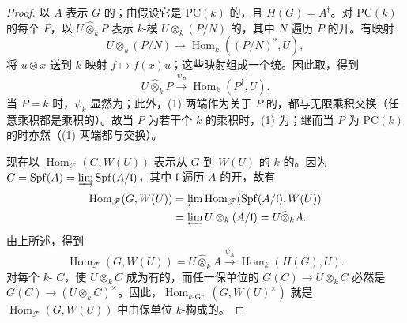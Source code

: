 \begin{proof}
以 $A$ 表示 $G$ 的；由假设它是 $\mathrm{PC}(k)$ 的，且 $H(G)=A^\dagger$。对 $\mathrm{PC}(k)$ 的每个 $P$，以 $U\widehat\otimes_k P$ 表示 $k$-模 $U\otimes_k(P/N)$ 的，其中 $N$ 遍历 $P$ 的开。有映射
\[
U\otimes_k(P/N)\longrightarrow\operatorname{Hom}_k((P/N)^*,U),
\]
将 $u\otimes x$ 送到 $k$-映射 $f\mapsto f(x)u$；这些映射组成一个统。因此取，得到
\[
U\widehat\otimes_k P\xrightarrow{\psi_P}\operatorname{Hom}_k(P^\dagger,U).\tag{1}
\]
当 $P=k$ 时，$\psi_k$ 显然为；此外，(1) 两端作为关于 $P$ 的，都与无限乘积交换（任意乘积都是乘积的）。故当 $P$ 为若干个 $k$ 的乘积时，(1) 为；继而当 $P$ 为 $\mathrm{PC}(k)$ 的时亦然（(1) 两端都与交换）。

现在以 $\operatorname{Hom}_{\mathscr F}(G,W(U))$ 表示从 $G$ 到 $W(U)$ 的 $k$-的。因为 $G=\operatorname{Spf}(A)=\varinjlim\operatorname{Spf}(A/\mathfrak l)$，其中 $\mathfrak l$ 遍历 $A$ 的开，故有
\[
\begin{aligned}
\operatorname{Hom}_{\mathscr F}(G,W(U))
&=\varprojlim\operatorname{Hom}_{\mathscr F}(\operatorname{Spf}(A/\mathfrak l),W(U))\\
&=\varprojlim U\otimes_k(A/\mathfrak l)=U\widehat\otimes_k A.
\end{aligned}
\]
由上所述，得到
\[
\operatorname{Hom}_{\mathscr F}(G,W(U))=U\widehat\otimes_k A\xrightarrow{\psi_A}\operatorname{Hom}_k(H(G),U).\tag{2}
\]
对每个 $k$- $C$，使 $U\otimes_k C$ 成为有的，而任一保单位的 $G(C)\to U\otimes_k C$ 必然是 $G(C)\to(U\otimes_k C)^\times$。因此，$\operatorname{Hom}_{k\text{-}\mathrm{Gr.}}(G,W(U)^\times)$ 就是 $\operatorname{Hom}_{\mathscr F}(G,W(U))$ 中由保单位 $k$-构成的。


\end{proof}
